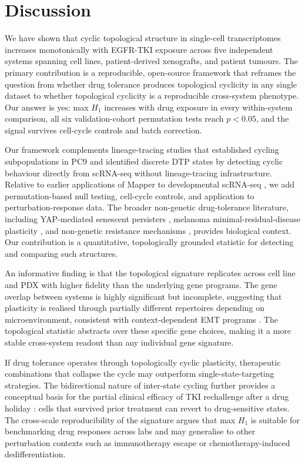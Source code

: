 \section{Discussion}

We have shown that cyclic topological structure in single-cell
transcriptomes increases monotonically with EGFR-TKI exposure across
five independent systems spanning cell lines, patient-derived
xenografts, and patient tumours. The primary contribution is a
reproducible, open-source framework that reframes the question from
whether drug tolerance produces topological cyclicity in any single
dataset to whether topological cyclicity is a reproducible cross-system
phenotype. Our answer is yes: max $H_1$ increases with drug exposure in
every within-system comparison, all six validation-cohort permutation
tests reach $p < 0.05$, and the signal survives cell-cycle controls and
batch correction.

Our framework complements lineage-tracing studies that established
cycling subpopulations in PC9 \citep{oren2021} and identified discrete
DTP states \citep{aissa2021} by detecting cyclic behaviour directly
from scRNA-seq without lineage-tracing infrastructure. Relative to
earlier applications of Mapper to developmental scRNA-seq
\citep{rizvi2017}, we add permutation-based null testing, cell-cycle
controls, and application to perturbation-response data. The broader
non-genetic drug-tolerance literature, including YAP-mediated
senescent persisters \citep{kurppa2020}, melanoma minimal-residual-disease
plasticity \citep{rambow2018}, and non-genetic resistance mechanisms
\citep{marine2020,shen2020}, provides biological context. Our
contribution is a quantitative, topologically grounded statistic for
detecting and comparing such structures.

An informative finding is that the topological signature replicates
across cell line and PDX with higher fidelity than the underlying gene
programs. The gene overlap between systems is highly significant but
incomplete, suggesting that plasticity is realised through partially
different repertoires depending on microenvironment, consistent with
context-dependent EMT programs \citep{dongre2019}. The topological
statistic abstracts over these specific gene choices, making it a more
stable cross-system readout than any individual gene signature.

If drug tolerance operates through topologically cyclic plasticity,
therapeutic combinations that collapse the cycle may outperform
single-state-targeting strategies. The bidirectional nature of
inter-state cycling further provides a conceptual basis for the partial
clinical efficacy of TKI rechallenge after a drug holiday
\citep{gatenby2009,enriquez-navas2016}: cells that survived prior
treatment can revert to drug-sensitive states. The cross-scale
reproducibility of the signature argues that max $H_1$ is suitable for
benchmarking drug responses across labs and may generalise to other
perturbation contexts such as immunotherapy escape or
chemotherapy-induced dedifferentiation.

